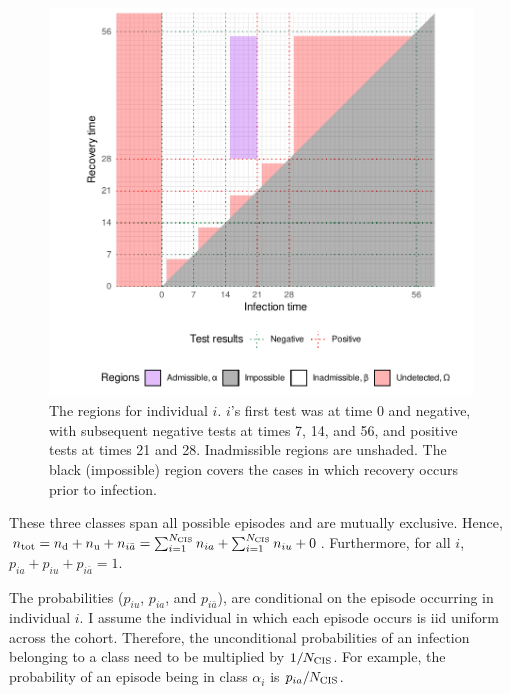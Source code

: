 \documentclass[thesis.tex]{subfiles}
\begin{document}
\begin{figure}
\includegraphics[width=\textwidth]{cis-perfect-testing/regions_diag}
\caption[Admissible, inadmissible, and undetected regions]{%
  The regions for individual $i$.
  $i$'s first test was at time 0 and negative, with subsequent negative tests at times 7, 14, and 56, and positive tests at times 21 and 28.
  Inadmissible regions are unshaded.
  The black (impossible) region covers the cases in which recovery occurs prior to infection.
  \label{perf-test:fig:partitionSpace}
}
\end{figure}

These three classes span all possible episodes and are mutually exclusive.
Hence, $n_\text{tot} = n_\text{d} + n_\text{u} + n_{i\bar{a}} = \sum_{i=1}^{N_\text{CIS}} n_{ia} + \sum_{i=1}^{N_\text{CIS}} n_{iu} + 0$.
Furthermore, for all $i$, $p_{ia} + p_{iu} + p_{i\bar{a}} = 1$.

The probabilities ($p_{iu}$, $p_{ia}$, and $p_{i\bar{a}}$), are conditional on the episode occurring in individual $i$.
I assume the individual in which each episode occurs is iid uniform across the cohort.
Therefore, the unconditional probabilities of an infection belonging to a class need to be multiplied by $1/N_\text{CIS}$.
For example, the probability of an episode being in class $\alpha_i$ is $p_{ia} / N_\text{CIS}$.
\end{document}
